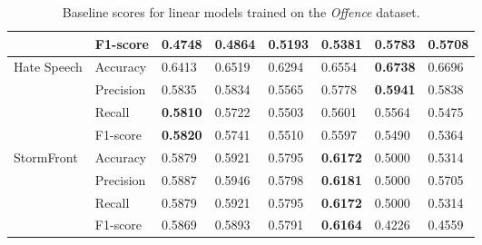 \begin{table}[]
\begin{minipage}{0.42\paperheight}
{\begin{tabular}{ll|ll|ll|ll}
                                        & F1-score  & 0.4748      & 0.4864       & 0.5193 & 0.5381          & \bf{0.5783} & 0.5708      \\ \hline
      \multirow{4}{*}{Hate Speech}      & Accuracy  & 0.6413      & 0.6519       & 0.6294 & 0.6554          & \bf{0.6738} & 0.6696      \\
                                        & Precision & 0.5835      & 0.5834       & 0.5565 & 0.5778          & \bf{0.5941} & 0.5838      \\
                                        & Recall    & \bf{0.5810} & 0.5722       & 0.5503 & 0.5601          & 0.5564      & 0.5475      \\
                                        & F1-score  & \bf{0.5820} & 0.5741       & 0.5510 & 0.5597          & 0.5490      & 0.5364      \\ \hline
      \multirow{4}{*}{StormFront}       & Accuracy  & 0.5879      & 0.5921       & 0.5795 & \bf{0.6172}     & 0.5000      & 0.5314      \\
                                        & Precision & 0.5887      & 0.5946       & 0.5798 & \bf{0.6181}     & 0.5000      & 0.5705      \\
                                        & Recall    & 0.5879      & 0.5921       & 0.5795 & \bf{0.6172}     & 0.5000      & 0.5314      \\
                                        & F1-score  & 0.5869      & 0.5893       & 0.5791 & \bf{0.6164}     & 0.4226      & 0.4559
    \end{tabular}%
    }
    \caption{Baseline scores for linear models trained on the \textit{Offence} dataset.}
    \label{tab:linear_offence_baselines}
    \vfill
\end{minipage}
\end{table}
